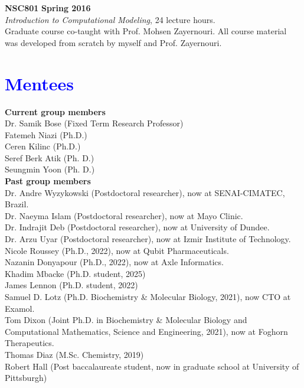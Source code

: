 \documentclass[margin,line]{res}
\begin{document}
\begin{resume}
{\bf NSC801} \hfill {\bf Spring 2016} \\
\emph{Introduction to Computational Modeling}, 24 lecture hours.\\
Graduate course co-taught with Prof. Mohsen Zayernouri.
All course material was developed from scratch by myself and Prof. Zayernouri.

\section{\sc \textcolor{blue}{ Mentees }}

{\bf Current group members}\\
Dr. Samik Bose (Fixed Term Research Professor) \\
Fatemeh Niazi (Ph.D.) \\
Ceren Kilinc (Ph.D.) \\
Seref Berk Atik (Ph. D.) \\
Seungmin Yoon (Ph. D.) \\

{\bf Past group members}\\
Dr. Andre Wyzykowski (Postdoctoral researcher), now at SENAI-CIMATEC, Brazil. \\
Dr. Naeyma Islam (Postdoctoral researcher), now at Mayo Clinic. \\
Dr. Indrajit Deb (Postdoctoral researcher), now at University of Dundee. \\
Dr. Arzu Uyar (Postdoctoral researcher), now at Izmir Institute of Technology.\\
Nicole Roussey (Ph.D., 2022), now at Qubit Pharmaceuticals. \\
Nazanin Donyapour (Ph.D., 2022), now at Axle Informatics. \\
Khadim Mbacke (Ph.D. student, 2025) \\
James Lennon (Ph.D. student, 2022) \\
Samuel D. Lotz (Ph.D. Biochemistry \& Molecular Biology, 2021), now CTO at Examol.\\
Tom Dixon (Joint Ph.D. in Biochemistry \& Molecular Biology and Computational Mathematics, Science and Engineering, 2021), now at Foghorn Therapeutics. \\
Thomas Diaz (M.Sc. Chemistry, 2019)\\
Robert Hall (Post baccalaureate student, now in graduate school at University of Pittsburgh)\\


\end{resume}
\end{document}
